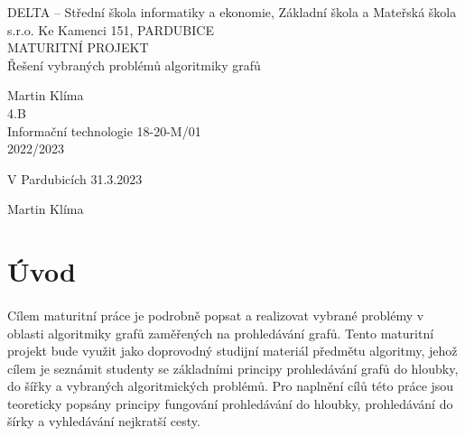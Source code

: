 \documentclass[12pt, titlepage, a4paper]{article}
\begin{document}
\begin{titlepage}
    \bfseries{
        \begin{center}
            \Large{DELTA – Střední škola informatiky a ekonomie, Základní škola a Mateřská škola
                s.r.o.
                \newline
                Ke Kamenci 151, PARDUBICE}
            \vspace{0.4 \textheight}\\
            \large{
                MATURITNÍ PROJEKT
            }\\
            \vspace{14pt}
            \LARGE{
                Řešení vybraných problémů algoritmiky grafů
            }
            \vspace{0.3 \textheight}
        \end{center}
        \noindent\large{Martin Klíma}\\
        \noindent\large{4.B}\\
        \noindent\large{Informační technologie 18-20-M/01}\\
        \noindent\large{2022/2023}\\
    }
\end{titlepage}
\clearpage


\clearpage
\vspace*{0.8\textheight}


\vspace{20pt}

\noindent V Pardubicích 31.3.2023 \hspace{150pt}\dotfill{}

\hspace{9.5cm} Martin Klíma
\clearpage
\tableofcontents
\newpage

\section{Úvod}
\paragraph{}
Cílem maturitní práce je podrobně popsat a realizovat vybrané problémy v oblasti
algoritmiky grafů zaměřených na prohledávání grafů.
Tento maturitní projekt bude využit jako doprovodný studijní materiál předmětu
algoritmy, jehož cílem je seznámit studenty se základními principy
prohledávání grafů do hloubky, do šířky a vybraných algoritmických problémů.
Pro naplnění cílů této práce jsou teoreticky popsány principy fungování prohledávání do hloubky,
prohledávání do šírky a vyhledávání nejkratší cesty.
\end{document}
